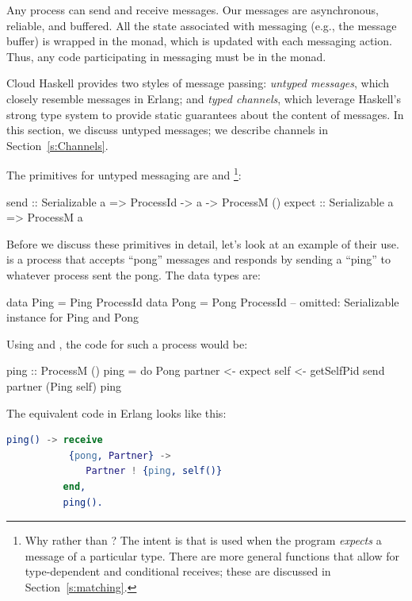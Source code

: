 \documentclass{sigplanconf}
\begin{document}
Any process can send and receive {messages}. Our messages are asynchronous, reliable, and buffered.  All the state associated with messaging (e.g., the message buffer) is wrapped in the  monad, which is updated with each messaging action. Thus, any code participating in messaging must be in the  monad.

Cloud Haskell provides two styles of message passing: \emph{untyped messages}, which closely resemble messages in Erlang; and \emph{typed channels}, which leverage Haskell's strong type system to provide static guarantees about the content of messages. In this section, we discuss untyped messages; we describe channels in Section~\ref{s:Channels}.

The primitives for untyped messaging are  and \footnote{Why  rather than ?  The intent is that  is used when the program \emph{expects} a message of a particular type.  
There are more general  functions that allow for type-dependent and conditional receives;  these are discussed in Section~\ref{s:matching}.}:

\par{\small
\begin{code}
send :: Serializable a => ProcessId -> a -> ProcessM ()
expect :: Serializable a => ProcessM a
\end{code}}
\noindent

Before we discuss these primitives in detail, let's look at an example of their use.
 is a process that accepts ``pong'' messages and responds by sending a ``ping'' to whatever process sent the pong. 
The data types are:
\begin{code}
data Ping = Ping ProcessId
data Pong = Pong ProcessId
-- omitted: Serializable instance for Ping and Pong
\end{code}
Using  and , the code for such a process would be:
\begin{code}
ping :: ProcessM ()
ping = do Pong partner <- expect
          self <- getSelfPid
          send partner (Ping self)
          ping
\end{code}

\noindent The equivalent code in Erlang looks like this:

\begin{lstlisting}[language=Erlang]
ping() -> receive
           {pong, Partner} -> 
              Partner ! {ping, self()}
          end,
          ping().               
\end{lstlisting}
\end{document}
